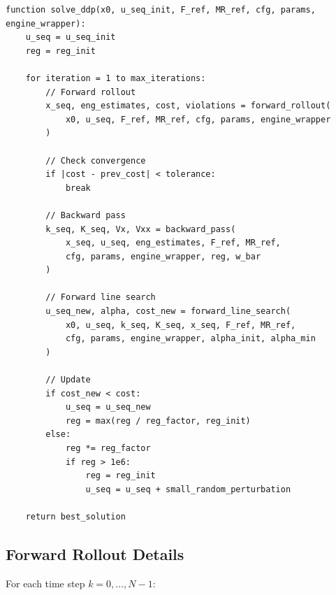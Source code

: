 \documentclass[11pt,a4paper]{article}
\begin{document}
\begin{verbatim}
function solve_ddp(x0, u_seq_init, F_ref, MR_ref, cfg, params, engine_wrapper):
    u_seq = u_seq_init
    reg = reg_init
    
    for iteration = 1 to max_iterations:
        // Forward rollout
        x_seq, eng_estimates, cost, violations = forward_rollout(
            x0, u_seq, F_ref, MR_ref, cfg, params, engine_wrapper
        )
        
        // Check convergence
        if |cost - prev_cost| < tolerance:
            break
        
        // Backward pass
        k_seq, K_seq, Vx, Vxx = backward_pass(
            x_seq, u_seq, eng_estimates, F_ref, MR_ref, 
            cfg, params, engine_wrapper, reg, w_bar
        )
        
        // Forward line search
        u_seq_new, alpha, cost_new = forward_line_search(
            x0, u_seq, k_seq, K_seq, x_seq, F_ref, MR_ref,
            cfg, params, engine_wrapper, alpha_init, alpha_min
        )
        
        // Update
        if cost_new < cost:
            u_seq = u_seq_new
            reg = max(reg / reg_factor, reg_init)
        else:
            reg *= reg_factor
            if reg > 1e6:
                reg = reg_init
                u_seq = u_seq + small_random_perturbation
    
    return best_solution
\end{verbatim}

\subsection{Forward Rollout Details}

For each time step $k = 0, \ldots, N-1$:
\end{document}

